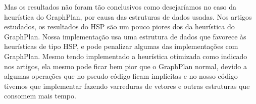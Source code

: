\documentclass[12pt,a4paper]{article}
\begin{document}
Mas os resultados não foram tão conclusivos como desejaríamos no caso da heurística do GraphPlan, por causa das estruturas de dados usadas.
Nos artigos estudados, os resultados do HSP são um pouco piores dos da heurística do GraphPlan.
Nossa implementação usa uma estrutura de dados que favorece às heurísticas de tipo HSP, e pode penalizar algumas das implementações com GraphPlan.
Mesmo tendo implementado a heurística otimizada como indicado nos artigos, ela mesmo pode ficar bem pior que o GraphPlan normal, devido a algumas operações que no pseudo-código ficam implícitas e no nosso código tivemos que implementar fazendo varreduras de vetores e outras estruturas que consomem mais tempo.







\end{document}
